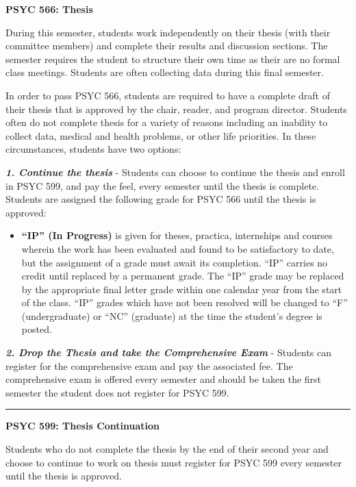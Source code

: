 \documentclass[openany]{book}
\providecommand{\tightlist}{%
  \setlength{\itemsep}{0pt}\setlength{\parskip}{0pt}}
\begin{document}
\textbf{PSYC 566: Thesis}

During this semester, students work independently on their thesis (with their committee members) and complete their results and discussion sections. The semester requires the student to structure their own time as their are no formal class meetings. Students are often collecting data during this final semester.

In order to pass PSYC 566, students are required to have a complete draft of their thesis that is approved by the chair, reader, and program director. Students often do not complete thesis for a variety of reasons including an inability to collect data, medical and health problems, or other life priorities. In these circumstances, students have two options:

\textbf{\emph{1. Continue the thesis}} - Students can choose to continue the thesis and enroll in PSYC 599, and pay the feel, every semester until the thesis is complete. Students are assigned the following grade for PSYC 566 until the thesis is approved:

\begin{itemize}
\tightlist
\item
  \textbf{``IP'' (In Progress)} is given for theses, practica, internships and courses wherein the work has been evaluated and found to be satisfactory to date, but the assignment of a grade must await its completion. ``IP'' carries no credit until replaced by a permanent grade. The ``IP'' grade may be replaced by the appropriate final letter grade within one calendar year from the start of the class. ``IP'' grades which have not been resolved will be changed to ``F'' (undergraduate) or ``NC'' (graduate) at the time the student's degree is posted.
\end{itemize}

\textbf{\emph{2. Drop the Thesis and take the Comprehensive Exam}} - Students can register for the comprehensive exam and pay the associated fee. The comprehensive exam is offered every semester and should be taken the first semester the student does not register for PSYC 599.

\begin{center}\rule{0.5\linewidth}{0.5pt}\end{center}

\textbf{PSYC 599: Thesis Continuation}

Students who do not complete the thesis by the end of their second year and choose to continue to work on thesis must register for PSYC 599 every semester until the thesis is approved.
\end{document}
